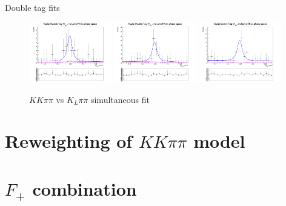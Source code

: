 \documentclass{beamer}
\begin{document}
\begin{frame}{Double tag fits}
\begin{figure}
    \includegraphics[width=0.32\textwidth, clip = true, trim = {0 11cm 0 0}]{Plots/DoubleTagYield_DoubleTag_SCMB_KKpipi_vs_KLpipi_SignalBin0_TagBin6.png}
    \includegraphics[width=0.32\textwidth, clip = true, trim = {0 11cm 0 0}]{Plots/DoubleTagYield_DoubleTag_SCMB_KKpipi_vs_KLpipi_SignalBin0_TagBin7.png}
    \includegraphics[width=0.32\textwidth, clip = true, trim = {0 11cm 0 0}]{Plots/DoubleTagYield_DoubleTag_SCMB_KKpipi_vs_KLpipi_SignalBin0_TagBin8.png}
    \caption{$KK\pi\pi$ vs $K_L\pi\pi$ simultaneous fit}
  \end{figure}
\end{frame}

\section{Reweighting of \texorpdfstring{$KK\pi\pi$}{KKpipi} model}

\section{\texorpdfstring{$F_+$}{F+} combination}
\end{document}
